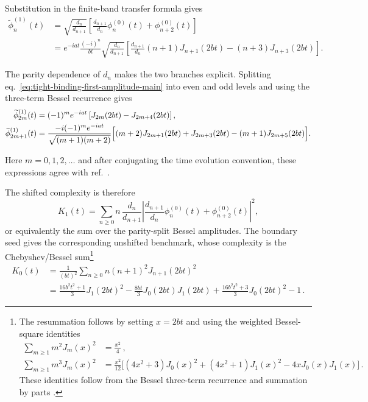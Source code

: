\documentclass[a4paper,11pt]{article}
\def\ii{i}%
\def\ee{e}%
\theoremstyle{definition}
\theoremstyle{remark}
\newcommand{\ii}{\mathrm i}
\newcommand{\ee}{\mathrm e}
\newcommand{\tphi}{\widetilde\phi}
\begin{document}
Substitution in the finite-band transfer formula gives
\begin{align}
   \tphi_n^{(1)}(t)
   &=
   \sqrt{\frac{d_n}{d_{n+1}}}
   \left[
      \frac{d_{n+1}}{d_n}\phi_n^{(0)}(t)+\phi_{n+2}^{(0)}(t)
   \right]
   \label{eq:tight-binding-first-amplitude-transfer-main}\\
   &=
   \ee^{-\ii at}\frac{(-\ii)^n}{bt}
   \sqrt{\frac{d_n}{d_{n+1}}}
   \left[
      \frac{d_{n+1}}{d_n}(n+1)J_{n+1}(2bt)
      -(n+3)J_{n+3}(2bt)
   \right].
   \label{eq:tight-binding-first-amplitude-main}
\end{align}
\begin{samepage}
The parity dependence of \(d_n\) makes the two branches explicit.
Splitting eq.~\eqref{eq:tight-binding-first-amplitude-main} into even and
odd levels and using the three-term Bessel recurrence gives
\begin{align}
   \tphi_{2m}^{(1)}(t)
   &=
   (-1)^m\ee^{-\ii at}
   \left[J_{2m}(2bt)-J_{2m+4}(2bt)\right], \label{eq:tight-binding-first-amplitude-parity-main}
\\
   \tphi_{2m+1}^{(1)}(t)
   &=
   \frac{-\ii(-1)^m\ee^{-\ii at}}{\sqrt{(m+1)(m+2)}}
   \Bigl[
      (m+2)J_{2m+1}(2bt)+J_{2m+3}(2bt)
      -(m+1)J_{2m+5}(2bt)
   \Bigr]. \nonumber
\end{align}
\end{samepage}
Here \(m=0,1,2,\ldots\) and after conjugating the time evolution
convention, these expressions agree with
ref.~\cite{Balasubramanian:2025variations}.

The shifted complexity is therefore
\begin{equation}
   K_1(t)=
   \sum_{n\ge0}n\,\frac{d_n}{d_{n+1}}
   \left|
      \frac{d_{n+1}}{d_n}\phi_n^{(0)}(t)+\phi_{n+2}^{(0)}(t)
   \right|^2,
   \label{eq:tight-binding-first-complexity-main}
\end{equation}
or equivalently the sum over the parity-split Bessel amplitudes. The boundary seed gives the corresponding unshifted benchmark, whose complexity is the Chebyshev/Bessel sum\footnote{The resummation follows by setting \(x=2bt\) and using the weighted Bessel-square identities
\begin{equation}
\begin{aligned}
   \sum_{m\ge1}m^2J_m(x)^2
   &=\frac{x^2}{4}\,,\\
   \sum_{m\ge1}m^3J_m(x)^2
   &=
   \frac{x^2}{12}
   \Big[
      (4x^2+3)J_0(x)^2
      +(4x^2+1)J_1(x)^2  
      -4xJ_0(x)J_1(x)
   \Big]\,.
\end{aligned}
\label{eq:bessel-rayleigh-lommel-sums}
\end{equation}
These identities follow from the Bessel three-term recurrence and summation by parts \cite{DLMF}.}
\begin{align}
   K_0(t)
   &=\frac{1}{(bt)^2}\sum_{n\ge0}n(n+1)^2J_{n+1}(2bt)^2 \nonumber\\
   &=
   \frac{16b^2t^2+1}{3}J_1(2bt)^2
   -\frac{8bt}{3}J_0(2bt)J_1(2bt)
   +\frac{16b^2t^2+3}{3}J_0(2bt)^2
   -1\,.
   \label{eq:tight-binding-reference-complexity-main}
\end{align}
\end{document}
